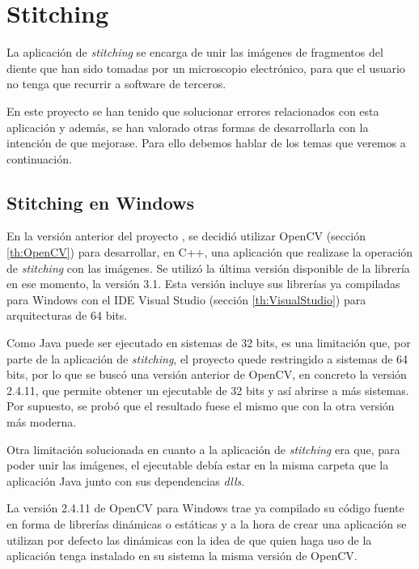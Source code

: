 \newpage

\section{Stitching}

La aplicación de \textit{stitching} se encarga de unir las imágenes de fragmentos del diente que han sido tomadas por un microscopio electrónico, para que el usuario no tenga que recurrir a software de terceros.

En este proyecto se han tenido que solucionar errores relacionados con esta aplicación y además, se han valorado otras formas de desarrollarla con la intención de que mejorase. Para ello debemos hablar de los temas que veremos a continuación.

\subsection{Stitching en Windows}
\label{ar:stitchingWindows}
En la versión anterior del proyecto \cite{perikymataV1}, se decidió utilizar OpenCV (sección \ref{th:OpenCV}) para desarrollar, en C++, una aplicación que realizase la operación de \textit{stitching} con las imágenes. Se utilizó la última versión disponible de la librería en ese momento, la versión 3.1. Esta versión incluye sus librerías ya compiladas para Windows con el IDE Visual Studio (sección \ref{th:VisualStudio}) para arquitecturas de 64 bits.

Como Java puede ser ejecutado en sistemas de 32 bits, es una limitación que, por parte de la aplicación de \textit{stitching}, el proyecto quede restringido a sistemas de 64 bits, por lo que se buscó una versión anterior de OpenCV, en concreto la versión 2.4.11, que permite obtener un ejecutable de 32 bits y así abrirse a más sistemas. Por supuesto, se probó que el resultado fuese el mismo que con la otra versión más moderna.

Otra limitación solucionada en cuanto a la aplicación de \textit{stitching} era que, para poder unir las imágenes, el ejecutable debía estar en la misma carpeta que la aplicación Java junto con sus dependencias \textit{dlls}.

La versión 2.4.11 de OpenCV para Windows trae ya compilado su código fuente en forma de librerías dinámicas o estáticas y a la hora de crear una aplicación se utilizan por defecto las dinámicas con la idea de que quien haga uso de la aplicación tenga instalado en su sistema la misma versión de OpenCV. 

